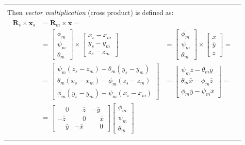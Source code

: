\documentclass[10pt,b5paper,titlepage]{book}
\newcommand{\m}{\mathbf}
\newenvironment{bbox}[1][0.96]
{
    \begin{center}
        \begin{tabular}{|p{#1\textwidth}|}
            \hline\\
}
{
            \\\\\hline
        \end{tabular}
    \end{center}
}
\newenvironment{eqarray}
{
    \begin{eqnarray}
        \begin{aligned}
}
{
        \end{aligned}
    \end{eqnarray}
}
\begin{document}
\begin{bbox}[0.95]
    Then \textit{vector multiplication} (cross product) is defined as:
    \begin{eqarray}
        \m{R}_s \times \m{x}_s
        &= \m{R}_m \times \m{x} = & \\
        &= \begin{bmatrix}
             \phi_m \\
             \psi_m \\
             \theta_m
           \end{bmatrix} \times \begin{bmatrix}
             x_s - x_m \\
             y_s - y_m \\
             z_s - z_m
           \end{bmatrix}
        &= \begin{bmatrix}
             \phi_m \\
             \psi_m \\
             \theta_m
           \end{bmatrix} \times \begin{bmatrix}
             \overline{x} \\
             \overline{y} \\
             \overline{z}
           \end{bmatrix} = \\
        &= \begin{bmatrix}
             \psi_m (z_s - z_m ) - \theta_m (y_s - y_m) \\
             \theta_m (x_s - x_m) - \phi_m (z_s - z_m) \\
             \phi_m (y_s - y_m) - \psi_m (x_s - x_m)
           \end{bmatrix}
        &= \begin{bmatrix}
            \psi_m \overline{z} - \theta_m \overline{y} \\
            \theta_m \overline{x} - \phi_m \overline{z} \\
            \phi_m \overline{y} - \psi_m \overline{x}
        \end{bmatrix} = \\
        &= \begin{bmatrix}
            \phantom{-}0 & \phantom{-}\overline{z} & -\overline{y} \\
            -\overline{z} & \phantom{-}0 & \phantom{-}\overline{x} \\
            \phantom{-}\overline{y} & -\overline{x} & \phantom{-}0
        \end{bmatrix}
        \begin{bmatrix}
            \phi_m \\
            \psi_m \\
            \theta_m
        \end{bmatrix}
    \end{eqarray}
\end{bbox}
\end{document}
